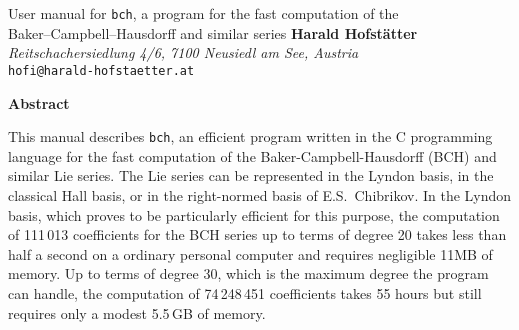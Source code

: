 \documentclass[11pt,a4paper]{article}
\begin{document}
\begin{center}
    {\LARGE User manual for {\tt bch}, a program for the fast computation of the\\[2mm]
    Baker--Campbell--Hausdorff and similar series}
\vskip 20pt
{\bf Harald Hofst\"atter}\\ %
{\small\it Reitschachersiedlung 4/6, 7100 Neusiedl am See, Austria}\\
{\tt hofi@harald-hofstaetter.at}\\ %
\end{center}
\vskip 20pt



\centerline{\bf Abstract}
\noindent
This manual describes \verb|bch|, 
an efficient  program written in the C programming language for the fast computation
of the Baker-Campbell-Hausdorff (BCH) and similar Lie series.
The Lie series can be represented in the Lyndon basis, in the
classical Hall basis, or in the right-normed basis of 
E.S.~Chibrikov.  In the Lyndon basis,
which proves to be particularly efficient for this purpose,
the computation of 111\,013 coefficients for the BCH series up to terms of degree 20
takes less than half a second on a ordinary personal computer and requires negligible 11MB of memory.
Up to terms of degree 30, which is the maximum degree the program can handle, 
the computation of 74\,248\,451 coefficients takes 55 hours but still requires only a modest 5.5\,GB of  memory.


\vskip 30pt

\end{document}
